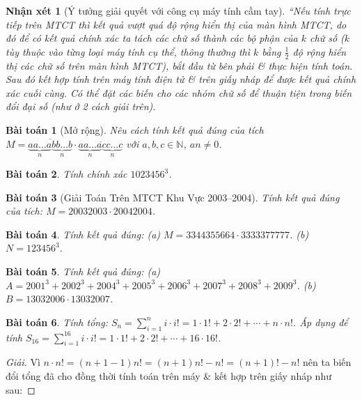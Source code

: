 \documentclass{article}
\newtheorem{baitoan}{Bài toán}
\newtheorem{nhanxet}{Nhận xét}
\begin{document}
\begin{nhanxet}[Ý tưởng giải quyết với công cụ máy tính cầm tay]
	``Nếu tính trực tiếp trên MTCT thì kết quả vượt quá độ rộng hiển thị của màn hình MTCT, do đó để có kết quả chính xác ta tách các chữ số thành các bộ phận của $k$ chữ số ($k$ tùy thuộc vào từng loại máy tính cụ thể, thông thường thì $k$ bằng $\frac{1}{2}$ độ rộng hiển thị các chữ số trên màn hình MTCT), bắt đầu từ bên phải \& thực hiện tính toán. Sau đó kết hợp tính trên máy tính điện tử \& trên giấy nháp để được kết quả chính xác cuối cùng. Có thể đặt các biến cho các nhóm chữ số để thuận tiện trong biến đổi đại số (như ở 2 cách giải trên).
\end{nhanxet}

\begin{baitoan}[Mở rộng]
	Nêu cách tính kết quả đúng của tích $M = \overline{\underbrace{aa\ldots a}_n\underbrace{bb\ldots b}_n}\cdot\overline{\underbrace{aa\ldots a}_n\underbrace{cc\ldots c}_n}$ với $a,b,c\in\mathbb{N}$, $an\ne0$.
\end{baitoan}

\begin{baitoan}
	Tính chính xác $1023456^3$.
\end{baitoan}

\begin{baitoan}[Giải Toán Trên MTCT Khu Vực 2003--2004]
	Tính kết quả đúng của tích: $M = 20032003\cdot20042004$.
\end{baitoan}

\begin{baitoan}
	Tính kết quả đúng: (a) $M = 3344355664\cdot3333377777$. (b) $N = 123456^3$.
\end{baitoan}

\begin{baitoan}
	Tính kết quả đúng: (a) $A = 2001^3 + 2002^3 + 2004^3 + 2005^3 + 2006^3 + 2007^3 + 2008^3 + 2009^3$. (b) $B = 13032006\cdot13032007$.
\end{baitoan}

\begin{baitoan}
	Tính tổng: $S_n = \sum_{i=1}^n i\cdot i! = 1\cdot1! + 2\cdot2! + \cdots + n\cdot n!$. Áp dụng để tính $S_{16} = \sum_{i=1}^{16} i\cdot i! = 1\cdot1! + 2\cdot2! + \cdots + 16\cdot16!$.
\end{baitoan}

\begin{proof}[Giải]
	Vì $n\cdot n! = (n + 1 - 1)n! = (n + 1)n! - n! = (n + 1)! - n!$ nên ta biến đổi tổng đã cho đồng thời tính toán trên máy \& kết hợp trên giấy nháp như sau: 
\end{proof}
\end{document}
